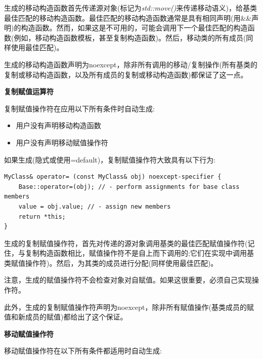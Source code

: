 生成的移动构造函数首先传递源对象(标记为\textit{std::move()}来传递移动语义)，给基类最佳匹配的移动构造函数。最佳匹配的移动构造函数通常是具有相同声明(用\&\&声明)的构造函数。然而，如果这是不可用的，可能会调用下一个最佳匹配的构造函数(例如，移动构造函数模板，甚至复制构造函数)。然后，移动类的所有成员(同样使用最佳匹配)。\par

生成的移动构造函数声明为noexcept，除非所有调用的移动/复制操作(所有基类的复制或移动构造函数，以及所有成员的复制或移动构造函数)都保证了这一点。\par

\hspace*{\fill} \par %
\textbf{复制赋值运算符}

复制赋值操作符在应用以下所有条件时自动生成:\par

\begin{itemize}
	\item 用户没有声明移动构造函数
	\item 用户没有声明移动赋值操作符
\end{itemize}

如果生成(隐式或使用=default)，复制赋值操作符大致具有以下行为:

\begin{lstlisting}[caption={}]
MyClass& operator= (const MyClass& obj) noexcept-specifier {
	Base::operator=(obj); // - perform assignments for base class members
	value = obj.value; // - assign new members
	return *this;
}
\end{lstlisting}

生成的复制赋值操作符，首先对传递的源对象调用基类的最佳匹配赋值操作符(记住，与复制构造函数相比，赋值操作符不是自上而下调用的;它们在实现中调用基类赋值操作符)。然后，为其类的成员进行分配(同样使用最佳匹配)。\par

注意，生成的赋值操作符不会检查对象对自赋值。如果这很重要，必须自己实现操作符。\par

此外，生成的复制赋值操作符声明为noexcept，除非所有赋值操作(基类成员的赋值和新成员的赋值)都给出了这个保证。\par

\hspace*{\fill} \par %
\textbf{移动赋值操作符}

移动赋值操作符在以下所有条件都适用时自动生成:\par

